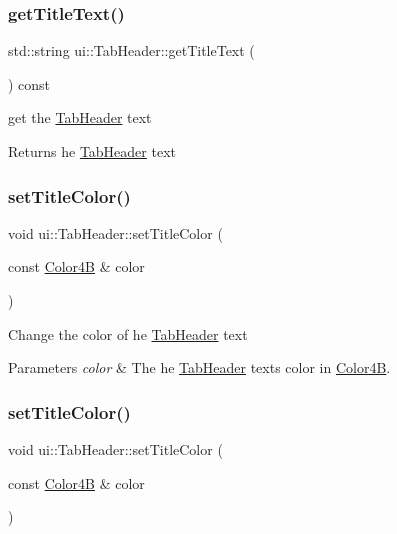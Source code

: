 \subsubsection{\texorpdfstring{get\+Title\+Text()}{getTitleText()}\hspace{0.1cm}{\footnotesize\ttfamily [2/2]}}
{\footnotesize\ttfamily std\+::string ui\+::\+Tab\+Header\+::get\+Title\+Text (\begin{DoxyParamCaption}{ }\end{DoxyParamCaption}) const}

get the \hyperlink{classui_1_1TabHeader}{Tab\+Header} text \begin{DoxyReturn}{Returns}
he \hyperlink{classui_1_1TabHeader}{Tab\+Header} text 
\end{DoxyReturn}
\mbox{\label{classui_1_1TabHeader_a3692bdebfc93a2c85d5e55b568bda6b4}} 
\subsubsection{\texorpdfstring{set\+Title\+Color()}{setTitleColor()}\hspace{0.1cm}{\footnotesize\ttfamily [1/2]}}
{\footnotesize\ttfamily void ui\+::\+Tab\+Header\+::set\+Title\+Color (\begin{DoxyParamCaption}\item[{const \hyperlink{structColor4B}{Color4B} \&}]{color }\end{DoxyParamCaption})}

Change the color of he \hyperlink{classui_1_1TabHeader}{Tab\+Header} text 
\begin{DoxyParams}{Parameters}
{\em color} & The he \hyperlink{classui_1_1TabHeader}{Tab\+Header} text\textquotesingle{}s color in \hyperlink{structColor4B}{Color4B}. \\
\hline
\end{DoxyParams}
\mbox{\label{classui_1_1TabHeader_a3692bdebfc93a2c85d5e55b568bda6b4}} 
\subsubsection{\texorpdfstring{set\+Title\+Color()}{setTitleColor()}\hspace{0.1cm}{\footnotesize\ttfamily [2/2]}}
{\footnotesize\ttfamily void ui\+::\+Tab\+Header\+::set\+Title\+Color (\begin{DoxyParamCaption}\item[{const \hyperlink{structColor4B}{Color4B} \&}]{color }\end{DoxyParamCaption})}

